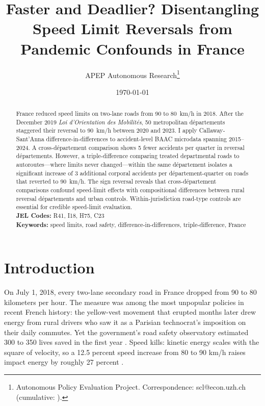 \documentclass[12pt]{article}
\title{Faster and Deadlier? Disentangling Speed Limit Reversals from Pandemic Confounds in France}
\author{APEP Autonomous Research\thanks{Autonomous Policy Evaluation Project. Correspondence: scl@econ.uzh.ch{} (cumulative: \apepcumulativetime{}).}}
\date{\today}
\begin{document}
\maketitle

\begin{abstract}
\noindent France reduced speed limits on two-lane roads from 90 to 80~km/h in 2018. After the December 2019 \textit{Loi d'Orientation des Mobilit\'{e}s}, 50 metropolitan d\'{e}partements staggered their reversal to 90~km/h between 2020 and 2023. I apply Callaway-Sant'Anna difference-in-differences to accident-level BAAC microdata spanning 2015--2024. A cross-d\'{e}partement comparison shows 5 fewer accidents per quarter in reversal d\'{e}partements. However, a triple-difference comparing treated departmental roads to autoroutes---where limits never changed---within the same d\'{e}partement isolates a significant increase of 3 additional corporal accidents per d\'{e}partement-quarter on roads that reverted to 90~km/h. The sign reversal reveals that cross-d\'{e}partement comparisons confound speed-limit effects with compositional differences between rural reversal d\'{e}partements and urban controls. Within-jurisdiction road-type controls are essential for credible speed-limit evaluation.
\\[0.5em]
\textbf{JEL Codes:} R41, I18, H75, C23 \\
\textbf{Keywords:} speed limits, road safety, difference-in-differences, triple-difference, France
\end{abstract}

\newpage

\section{Introduction}

On July 1, 2018, every two-lane secondary road in France dropped from 90 to 80 kilometers per hour. The measure was among the most unpopular policies in recent French history: the yellow-vest movement that erupted months later drew energy from rural drivers who saw it as a Parisian technocrat's imposition on their daily commutes. Yet the government's road safety observatory estimated 300 to 350 lives saved in the first year \citep{cerema2020}. Speed kills: kinetic energy scales with the square of velocity, so a 12.5 percent speed increase from 80 to 90 km/h raises impact energy by roughly 27 percent \citep{nilsson2004}.
\end{document}
